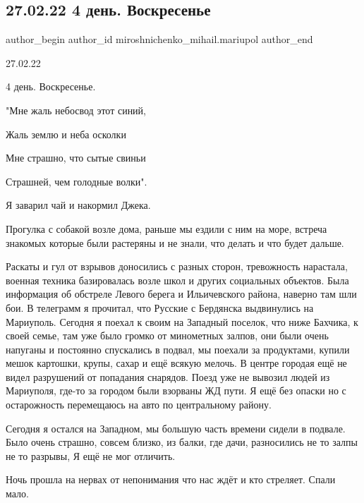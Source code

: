  
 
 
 
 

\subsection{27.02.22 4 день. Воскресенье}
\label{sec:27_02_2023.fb.miroshnichenko_mihail.mariupol.1.27_02_22_4_den__vosk}

\ifcmt
 author_begin
   author_id miroshnichenko_mihail.mariupol
 author_end
\fi

27.02.22

4 день. Воскресенье.

"Мне жаль небосвод этот синий,

Жаль землю и неба осколки

Мне страшно, что сытые свиньи

Страшней, чем голодные волки".

Я заварил чай и накормил Джека.

Прогулка с собакой возле дома, раньше мы ездили с ним на море,  встреча
знакомых которые были растеряны и не знали, что делать и что будет дальше.

Раскаты и гул от взрывов доносились с разных сторон, тревожность нарастала,
военная техника базировалась возле школ и других социальных объектов. Была
информация об обстреле Левого берега и Ильичевского района, наверно там шли
бои. В телеграмм я прочитал, что Русские с Бердянска выдвинулись на Мариуполь.
Сегодня я поехал к своим на Западный поселок, что ниже Бахчика, к своей семье,
там уже было громко от минометных залпов, они были очень напуганы и постоянно
спускались в подвал, мы поехали за продуктами, купили мешок картошки, крупы,
сахар и ещё всякую мелочь. В центре городая ещё не видел разрушений от
попадания снарядов. Поезд уже не вывозил людей из Мариуполя, где-то за городом
были взорваны ЖД пути. Я ещё без опаски но с остарожность перемещаюсь на авто
по центральному району. 

Сегодня я остался на Западном, мы большую часть времени сидели в подвале. Было
очень страшно, совсем близко, из балки, где дачи, разносились не то залпы не то
разрывы, Я ещё не мог отличить.

Ночь прошла на нервах от непонимания что нас ждёт и кто стреляет. Спали мало.
